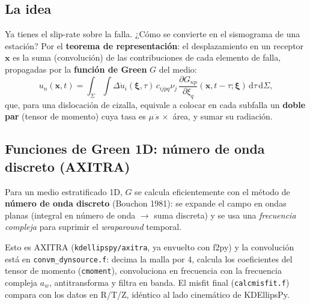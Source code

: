 \documentclass[11pt,a4paper]{article}
\newcommand{\dd}{\mathrm{d}}
\newcommand{\pd}[2]{\frac{\partial #1}{\partial #2}}
\newcommand{\vv}[1]{\mathbf{#1}}
\begin{document}
\subsection{La idea}
Ya tienes el slip-rate sobre la falla. ¿Cómo se convierte en el sismograma de una
estación? Por el \textbf{teorema de representación}: el desplazamiento en un
receptor $\vv x$ es la suma (convolución) de las contribuciones de cada elemento
de falla, propagadas por la \textbf{función de Green} $G$ del medio:
\begin{equation}
  u_n(\vv x,t)=\int_{\Sigma}\!\!\int \Delta\dot u_i(\vv\xi,\tau)\,
     c_{ijpq}\nu_j\,\pd{G_{np}}{\xi_q}(\vv x,t-\tau;\vv\xi)\,\dd\tau\,\dd\Sigma,
\end{equation}
que, para una dislocación de cizalla, equivale a colocar en cada subfalla un
\textbf{doble par} (tensor de momento) cuya tasa es $\mu\,\dot s\,\times$ área, y
sumar su radiación.

\subsection{Funciones de Green 1D: número de onda discreto (AXITRA)}
Para un medio estratificado 1D, $G$ se calcula eficientemente con el método de
\textbf{número de onda discreto} (Bouchon 1981): se expande el campo en
ondas planas (integral en número de onda $\to$ suma discreta) y se usa una
\emph{frecuencia compleja} para suprimir el \emph{wraparound} temporal.

\begin{codebox}
Esto es AXITRA (\texttt{kdellipspy/axitra}, ya envuelto con f2py) y la convolución
está en \texttt{convm\_dynsource.f}: decima la malla por 4, calcula los
coeficientes del tensor de momento (\texttt{cmoment}), convoluciona en frecuencia
con la frecuencia compleja $a_w$, antitransforma y filtra en banda. El misfit
final (\texttt{calcmisfit.f}) compara con los datos en R/T/Z, idéntico al lado
cinemático de KDEllipsPy.
\end{codebox}
\end{document}
